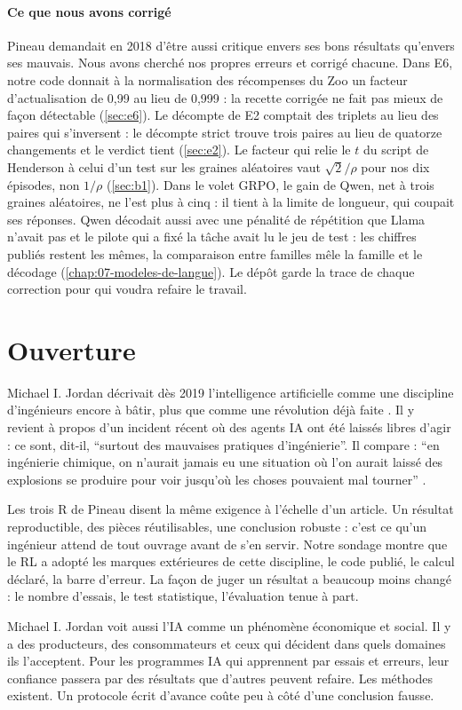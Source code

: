 \paragraph{Ce que nous avons corrigé}
Pineau demandait en 2018 d'être aussi critique envers ses bons résultats qu'envers ses mauvais.
Nous avons cherché nos propres erreurs et corrigé chacune. Dans E6, notre code donnait à la
normalisation des récompenses du Zoo un facteur d'actualisation de 0,99 au lieu de 0,999 : la recette
corrigée ne fait pas mieux de façon détectable (\cref{sec:e6}). Le décompte de E2 comptait des triplets
au lieu des paires qui s'inversent : le décompte strict trouve trois paires au lieu de quatorze
changements et le verdict tient (\cref{sec:e2}). Le facteur qui relie le $t$ du script de Henderson à
celui d'un test sur les graines aléatoires vaut $\sqrt2/\rho$ pour nos dix épisodes, non $1/\rho$
(\cref{sec:b1}). Dans le volet GRPO, le gain de Qwen, net à trois graines aléatoires, ne l'est plus à
cinq : il tient à la limite de longueur, qui coupait ses réponses. Qwen décodait aussi avec une
pénalité de répétition que Llama n'avait pas et le pilote qui a fixé la tâche avait lu le jeu de test :
les chiffres publiés restent les mêmes, la comparaison entre familles mêle la famille et le décodage
(\cref{chap:07-modeles-de-langue}). Le dépôt garde la trace de chaque correction pour qui voudra
refaire le travail.

\section{Ouverture}\label{sec:ouverture}
Michael I. Jordan décrivait dès 2019 l'intelligence artificielle comme une discipline d'ingénieurs
encore à bâtir, plus que comme une révolution déjà faite
\parencite{mijordan2019revolution,mijordan2019drai}. Il y revient à propos d'un incident récent où des
agents IA ont été laissés libres d'agir : ce sont, dit-il, \enquote{surtout des mauvaises pratiques
d'ingénierie}. Il compare : \enquote{en ingénierie chimique, on n'aurait jamais eu une situation où
l'on aurait laissé des explosions se produire pour voir jusqu'où les choses pouvaient mal tourner}
\parencite{mijordan2026liberation}.

Les trois R de Pineau disent la même exigence à l'échelle d'un article. Un résultat reproductible,
des pièces réutilisables, une conclusion robuste : c'est ce qu'un ingénieur attend de tout ouvrage
avant de s'en servir. Notre sondage montre que le RL a adopté les marques extérieures de cette
discipline, le code publié, le calcul déclaré, la barre d'erreur. La façon de juger un résultat a
beaucoup moins changé : le nombre d'essais, le test statistique, l'évaluation tenue à part.

Michael I. Jordan voit aussi l'IA comme un phénomène économique et social. Il y a des producteurs,
des consommateurs et ceux qui décident dans quels domaines ils l'acceptent. Pour les programmes IA
qui apprennent par essais et erreurs, leur confiance passera par des résultats que d'autres peuvent
refaire. Les méthodes existent. Un protocole écrit d'avance coûte peu à côté d'une conclusion fausse.

